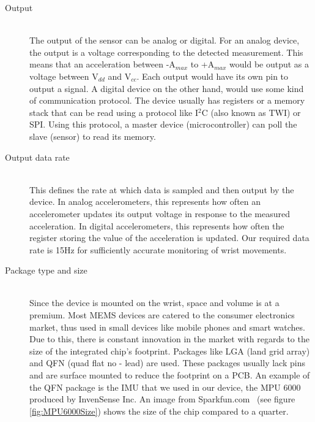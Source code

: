 \begin{description}

\item[Output] \hfill \\
The output of the sensor can be analog or digital. For an analog device, the output is a voltage corresponding to the detected measurement. This means that an acceleration between -A$_{max}$ to +A$_{max}$ would be output as a voltage between V$_{dd}$ and V$_{cc}$. Each output would have its own pin to output a signal. A digital device on the other hand, would use some kind of communication protocol. The device usually has registers or a memory stack that can be read using a protocol like I$^2$C (also known as TWI) or SPI. Using this protocol, a master device (microcontroller) can poll the slave (sensor) to read its memory.

\item[Output data rate] \hfill \\
This defines the rate at which data is sampled and then output by the device.
In analog accelerometers,
this represents how often an accelerometer updates its output voltage in response to the measured acceleration.
In digital accelerometers,
this represents how often the register storing the value of the acceleration is updated.
Our required data rate is 15Hz for sufficiently accurate monitoring of wrist movements.

\item[Package type and size] \hfill \\
Since the device is mounted on the wrist, space and volume is at a premium.
Most MEMS devices are catered to the consumer electronics market,
thus used in small devices like mobile phones and smart watches. Due to this,
there is constant innovation in the market with regards to the size of the integrated chip's footprint.
Packages like LGA (land grid array) and QFN (quad flat no - lead) are used.
These packages usually lack pins and are surface mounted to reduce the footprint on a PCB.
An example of the QFN package is the IMU that we used in our device, the MPU 6000 produced by InvenSense Inc.
An image from Sparkfun.com~\cite{Image:SparkfunMPU6000}  (see figure \ref{fig:MPU6000Size}) shows the size of the chip compared to a quarter.


\end{description}
